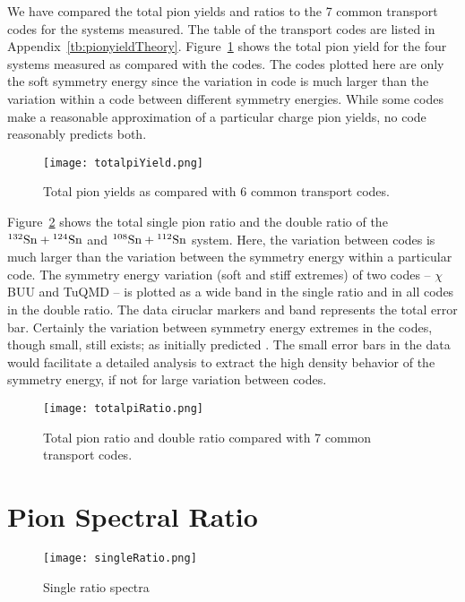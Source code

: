 We have compared the total pion yields and ratios to the 7 common transport codes for the systems measured. The table of the transport codes are listed in Appendix~\ref{tb:pionyieldTheory}. Figure~\ref{fig:totalpiYield} shows the total pion yield for the four systems measured as compared with the codes. The codes plotted here are only the soft symmetry energy since the variation in code is much larger than the variation within a code between different symmetry energies. While some codes make a reasonable approximation of a particular charge pion yields, no code reasonably predicts both. 

\begin{figure}[!htb]
\centering
\texttt{[image: totalpiYield.png]}
\caption{Total pion yields as compared with 6 common transport codes.}
\label{fig:totalpiYield}
\end{figure}

Figure~\ref{fig:totalpiRatio} shows the total single pion ratio and the double ratio of the ${}^{132}\mathrm{Sn} + {}^{124}\mathrm{Sn}$ and ${}^{108}\mathrm{Sn} + {}^{112}\mathrm{Sn}$ system. Here, the variation between codes is much larger than the variation between the symmetry energy within a particular code. The symmetry energy variation (soft and stiff extremes) of two codes -- $\chi$BUU and TuQMD -- is plotted as a wide band in the single ratio and in all codes in the double ratio. The data ciruclar markers and band represents the total error bar. Certainly the variation between symmetry energy extremes in the codes, though small, still exists; as initially predicted \cite{baoan_piprod1,baoan_piprod2}. The small error bars in the data would facilitate a detailed analysis to extract the high density behavior of the symmetry energy, if not for large variation between codes. 



\begin{figure}[!htb]
\centering
\texttt{[image: totalpiRatio.png]}
\caption{Total pion ratio and double ratio compared with 7 common transport codes.}
\label{fig:totalpiRatio}
\end{figure}



\section{Pion Spectral Ratio}


\begin{figure}[!htb]
\centering
\texttt{[image: singleRatio.png]}
\caption{Single ratio spectra}
\label{fig:SRspectra}
\end{figure}

